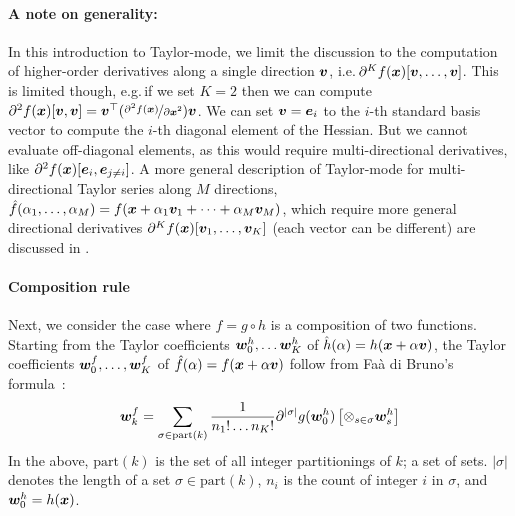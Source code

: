 \paragraph{A note on generality:} In this introduction to Taylor-mode, we limit the discussion to the computation of higher-order derivatives along a single direction ${\bm{v}}$, i.e.\,$\partial^Kf({\bm{x}})[{\bm{v}}, \dots, {\bm{v}}]$.
This is limited though, e.g.\,if we set $K=2$ then we can compute $\partial^2 f({\bm{x}})[{\bm{v}}, {\bm{v}}] = {\bm{v}}^{\top} (\nicefrac{\partial^2 f({\bm{x}})}{\partial{\bm{x}}^2}) {\bm{v}}$.
We can set ${\bm{v}} = {\bm{e}}_i$ to the $i$-th standard basis vector to compute the $i$-th diagonal element of the Hessian.
But we cannot evaluate off-diagonal elements, as this would require multi-directional derivatives, like $\partial^2 f({\bm{x}}) [{\bm{e}}_i, {\bm{e}}_{j\neq i}]$.
A more general description of Taylor-mode for multi-directional Taylor series along $M$ directions, $\hat{f}(\alpha_1, \dots, \alpha_M) = f({\bm{x}} + \alpha_1 {\bm{v}}_1 + \dots + \alpha_M {\bm{v}}_M)$, which require more general directional derivatives $\partial^K f({\bm{x}}) [{\bm{v}}_1, \dots, {\bm{v}}_K]$ (each vector can be different) are discussed in \cite{johnson2021taylor-made}.

\paragraph{Composition rule}
Next, we consider the case where $f = g \circ h$ is a composition of two functions. Starting from the Taylor coefficients ${\bm{w}}_0^h, \dots {\bm{w}}_K^h$ of $\hat{h}(\alpha) = h({\bm{x}} + \alpha {\bm{v}})$, the Taylor coefficients ${\bm{w}}_0^f, \dots, {\bm{w}}_K^f$ of $\hat{f}(\alpha) = f({\bm{x}} + \alpha{\bm{v}})$ follow from Fa\`a di Bruno's formula~\cite{griewank2008evaluating,bettencourt2019taylor}:
\begin{align}\label{eq:taylor-mode-forward}
  {\bm{w}}_{k}^f
  =
  \sum_{\sigma \in \mathrm{part}(k)}
  \frac{1}{n_1! \dots n_K!}
  \partial^{|\sigma|}g({\bm{w}}_0^h)
  \left[
  \otimes_{s \in \sigma}
  {\bm{w}}_s^h
  \right]
\end{align}
In the above, $\mathrm{part}(k)$ is the set of all integer partitionings of $k$; a set of sets. $|\sigma|$ denotes the length of a set $\sigma \in \mathrm{part}(k)$, $n_i$ is the count of integer $i$ in $\sigma$, and ${\bm{w}}_0^h = h({\bm{x}})$.

